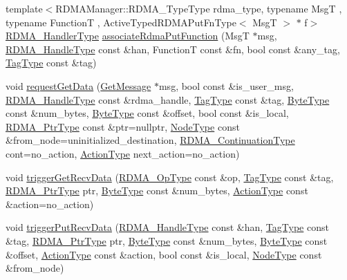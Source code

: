 \begin{DoxyCompactItemize}
{\footnotesize template$<$R\+D\+M\+A\+Manager\+::\+R\+D\+M\+A\+\_\+\+Type\+Type rdma\+\_\+type, typename MsgT , typename FunctionT , Active\+Typed\+R\+D\+M\+A\+Put\+Fn\+Type$<$ Msg\+T $>$ $\ast$ f$>$ }\\\hyperlink{namespacevt_a9530efb893c0f3846e8ac5f0507e0f49}{R\+D\+M\+A\+\_\+\+Handler\+Type} \hyperlink{structvt_1_1rdma_1_1_r_d_m_a_manager_a08df53322f7811c8a80911506d3db362}{associate\+Rdma\+Put\+Function} (MsgT $\ast$msg, \hyperlink{namespacevt_a10442579ec4e7ebef223818e64bcf908}{R\+D\+M\+A\+\_\+\+Handle\+Type} const \&han, FunctionT const \&fn, bool const \&any\+\_\+tag, \hyperlink{namespacevt_a84ab281dae04a52a4b243d6bf62d0e52}{Tag\+Type} const \&tag)
\item 
void \hyperlink{structvt_1_1rdma_1_1_r_d_m_a_manager_aee554383c0376e3751d0957b2c04cc75}{request\+Get\+Data} (\hyperlink{namespacevt_1_1rdma_acce0da4c9ea1233c3f132c1971943653}{Get\+Message} $\ast$msg, bool const \&is\+\_\+user\+\_\+msg, \hyperlink{namespacevt_a10442579ec4e7ebef223818e64bcf908}{R\+D\+M\+A\+\_\+\+Handle\+Type} const \&rdma\+\_\+handle, \hyperlink{namespacevt_a84ab281dae04a52a4b243d6bf62d0e52}{Tag\+Type} const \&tag, \hyperlink{namespacevt_aab8d55968084610ce3b17057981e9300}{Byte\+Type} const \&num\+\_\+bytes, \hyperlink{namespacevt_aab8d55968084610ce3b17057981e9300}{Byte\+Type} const \&offset, bool const \&is\+\_\+local, \hyperlink{namespacevt_a9e2c953286c7616f7c218e9951790776}{R\+D\+M\+A\+\_\+\+Ptr\+Type} const \&ptr=nullptr, \hyperlink{namespacevt_a866da9d0efc19c0a1ce79e9e492f47e2}{Node\+Type} const \&from\+\_\+node=uninitialized\+\_\+destination, \hyperlink{namespacevt_a9880273f1697d78c2171f8d8f044de51}{R\+D\+M\+A\+\_\+\+Continuation\+Type} cont=no\+\_\+action, \hyperlink{namespacevt_ae0a5a7b18cc99d7b732cb4d44f46b0f3}{Action\+Type} next\+\_\+action=no\+\_\+action)
\item 
void \hyperlink{structvt_1_1rdma_1_1_r_d_m_a_manager_a38e87a342616670eb3679e649e3c39cf}{trigger\+Get\+Recv\+Data} (\hyperlink{namespacevt_1_1rdma_a9b966d9780a2b41afe7cd7b7b4b20300}{R\+D\+M\+A\+\_\+\+Op\+Type} const \&op, \hyperlink{namespacevt_a84ab281dae04a52a4b243d6bf62d0e52}{Tag\+Type} const \&tag, \hyperlink{namespacevt_a9e2c953286c7616f7c218e9951790776}{R\+D\+M\+A\+\_\+\+Ptr\+Type} ptr, \hyperlink{namespacevt_aab8d55968084610ce3b17057981e9300}{Byte\+Type} const \&num\+\_\+bytes, \hyperlink{namespacevt_ae0a5a7b18cc99d7b732cb4d44f46b0f3}{Action\+Type} const \&action=no\+\_\+action)
\item 
void \hyperlink{structvt_1_1rdma_1_1_r_d_m_a_manager_a7670a52bb5673c5e15a6ff21097847f3}{trigger\+Put\+Recv\+Data} (\hyperlink{namespacevt_a10442579ec4e7ebef223818e64bcf908}{R\+D\+M\+A\+\_\+\+Handle\+Type} const \&han, \hyperlink{namespacevt_a84ab281dae04a52a4b243d6bf62d0e52}{Tag\+Type} const \&tag, \hyperlink{namespacevt_a9e2c953286c7616f7c218e9951790776}{R\+D\+M\+A\+\_\+\+Ptr\+Type} ptr, \hyperlink{namespacevt_aab8d55968084610ce3b17057981e9300}{Byte\+Type} const \&num\+\_\+bytes, \hyperlink{namespacevt_aab8d55968084610ce3b17057981e9300}{Byte\+Type} const \&offset, \hyperlink{namespacevt_ae0a5a7b18cc99d7b732cb4d44f46b0f3}{Action\+Type} const \&action, bool const \&is\+\_\+local, \hyperlink{namespacevt_a866da9d0efc19c0a1ce79e9e492f47e2}{Node\+Type} const \&from\+\_\+node)

\end{DoxyCompactItemize}
